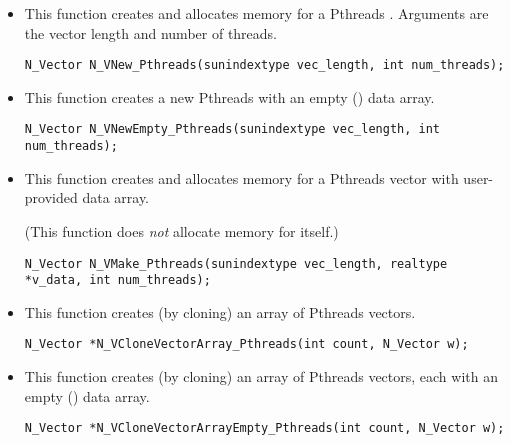 \begin{itemize}


\item {}

  This function creates and allocates memory for a Pthreads .
  Arguments are the vector length and number of threads.

  

  \verb|N_Vector N_VNew_Pthreads(sunindextype vec_length, int num_threads);|


\item {}

  This function creates a new Pthreads  with an empty () data array.

  

  \verb|N_Vector N_VNewEmpty_Pthreads(sunindextype vec_length, int num_threads);|


\item {}

 This function creates and allocates memory for a Pthreads vector
 with user-provided data array.

 (This function does {\em not} allocate memory for  itself.)

 \verb|N_Vector N_VMake_Pthreads(sunindextype vec_length, realtype *v_data, int num_threads);|


\item {}

 This function creates (by cloning) an array of  Pthreads vectors.

 

 \verb|N_Vector *N_VCloneVectorArray_Pthreads(int count, N_Vector w);|


\item {}

 This function creates (by cloning) an array of  Pthreads vectors, each with an
 empty () data array.

 

 \verb|N_Vector *N_VCloneVectorArrayEmpty_Pthreads(int count, N_Vector w);|


\end{itemize}
